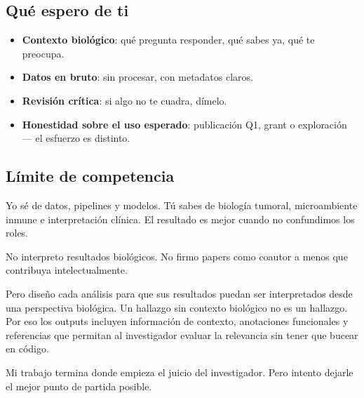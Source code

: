 \documentclass[11pt]{article}
\begin{document}
\subsection*{Qué espero de ti}

\begin{itemize}[label=\textendash]
  \item \textbf{Contexto biológico}: qué pregunta responder, qué sabes ya, qué te preocupa.
  \item \textbf{Datos en bruto}: sin procesar, con metadatos claros.
  \item \textbf{Revisión crítica}: si algo no te cuadra, dímelo.
  \item \textbf{Honestidad sobre el uso esperado}: publicación Q1, grant o exploración --- el esfuerzo es distinto.
\end{itemize}

\subsection*{Límite de competencia}

Yo sé de datos, pipelines y modelos. Tú sabes de biología tumoral, microambiente inmune e interpretación clínica. El resultado es mejor cuando no confundimos los roles.

No interpreto resultados biológicos. No firmo papers como coautor a menos que contribuya intelectualmente.

Pero diseño cada análisis para que sus resultados puedan ser interpretados desde una perspectiva biológica. Un hallazgo sin contexto biológico no es un hallazgo. Por eso los outputs incluyen información de contexto, anotaciones funcionales y referencias que permitan al investigador evaluar la relevancia sin tener que bucear en código.

Mi trabajo termina donde empieza el juicio del investigador. Pero intento dejarle el mejor punto de partida posible.
\end{document}
